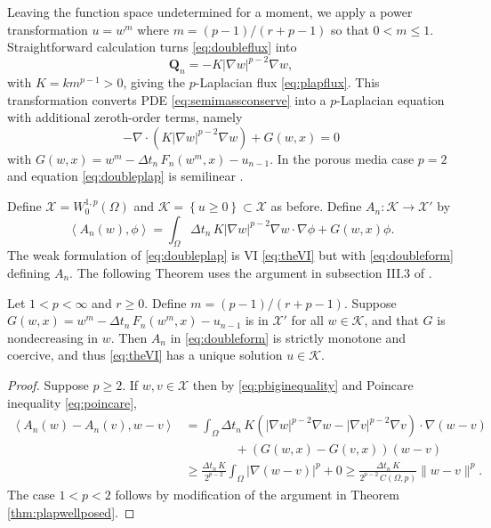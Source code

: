 \documentclass[final,onefignum]{siamart190516}
\newcommand\bQ{\mathbf{Q}}
\newcommand{\Div}{\nabla\cdot}
\newcommand{\grad}{\nabla}
\newcommand{\ip}[2]{\ensuremath{\left<#1,#2\right>}}
\begin{document}
Leaving the function space undetermined for a moment, we apply a power transformation $u = w^m$ where $m = (p-1)/(r+p-1)$ \cite{Raviart1970} so that $0 < m \le 1$.  Straightforward calculation turns \eqref{eq:doubleflux} into
\begin{equation}
	\bQ_n = - K |\grad w|^{p-2} \grad w, \label{eq:doublenewflux}
\end{equation}
with $K=k m^{p-1}>0$, giving the $p$-Laplacian flux \eqref{eq:plapflux}.  This transformation converts PDE \eqref{eq:semimassconserve} into a $p$-Laplacian equation with additional zeroth-order terms, namely
\begin{equation}
    - \Div\left(K|\grad w|^{p-2} \grad w\right) + G(w,x) = 0  \label{eq:doubleplap}
\end{equation}
with $G(w,x) = w^m - \Delta t_n\, F_n(w^m,x) - u_{n-1}$.  In the porous media case $p=2$ and equation \eqref{eq:doubleplap} is semilinear \cite{Evans2010}.

Define $\mathcal{X} = W_0^{1,p}(\Omega)$ and $\mathcal{K} =\left\{u\ge 0\right\} \subset \mathcal{X}$ as before.  Define $A_n: \mathcal{K} \to \mathcal{X}'$ by
\begin{equation}
\ip{A_n(w)}{\phi} = \int_\Omega \Delta t_n\, K |\grad w|^{p-2} \grad w\cdot \grad \phi + G(w,x)\phi. \label{eq:doubleform}
\end{equation}
The weak formulation of \eqref{eq:doubleplap} is VI \eqref{eq:theVI} but with \eqref{eq:doubleform} defining $A_n$.  The following Theorem uses the argument in subsection III.3 of \cite{KinderlehrerStampacchia1980}.

\begin{theorem}
Let $1<p<\infty$ and $r\ge 0$.  Define $m = (p-1)/(r+p-1)$.  Suppose $G(w,x)=w^m - \Delta t_n\, F_n(w^m,x) - u_{n-1}$ is in $\mathcal{X}'$ for all $w\in\mathcal{K}$, and that $G$ is nondecreasing in $w$.  Then $A_n$ in \eqref{eq:doubleform} is strictly monotone and coercive, and thus \eqref{eq:theVI} has a unique solution $u\in\mathcal{K}$.
\end{theorem}

\begin{proof}
Suppose $p\ge 2$.  If $w,v\in\mathcal{X}$ then by \eqref{eq:pbiginequality} and Poincare inequality \eqref{eq:poincare},
\begin{align*}
\ip{A_n(w)-A_n(v)}{w-v} &= \int_\Omega \Delta t_n\, K \left(|\grad w|^{p-2} \grad w - |\grad v|^{p-2} \grad v\right) \cdot \grad (w-v) \\
  &\qquad\qquad + \left(G(w,x) - G(v,x)\right) (w-v) \\
  &\ge \frac{\Delta t_n\,K}{2^{p-2}} \int_\Omega |\grad (w-v)|^p + 0 \ge \frac{\Delta t_n\,K}{2^{p-2}\, C(\Omega,p)} \|w-v\|^p.
\end{align*}
The case $1<p<2$ follows by modification of the argument in Theorem \ref{thm:plapwellposed}.
\end{proof}
\end{document}

